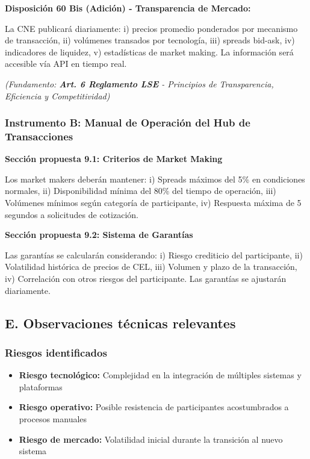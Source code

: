 \documentclass{cel}
\begin{document}
\textbf{Disposición 60 Bis (Adición) - Transparencia de Mercado:}

\textquotedbl{}La CNE publicará diariamente: i) precios promedio ponderados por mecanismo de transacción, ii) volúmenes transados por tecnología, iii) spreads bid-ask, iv) indicadores de liquidez, v) estadísticas de market making. La información será accesible vía API en tiempo real.\textquotedbl{}

\textit{(Fundamento: \textbf{Art. 6 Reglamento LSE} - Principios de Transparencia, Eficiencia y Competitividad)}


\subsubsection{Instrumento B: Manual de Operación del Hub de Transacciones}
\nopagebreak

\textbf{Sección propuesta 9.1: Criterios de Market Making}

\textquotedbl{}Los market makers deberán mantener: i) Spreads máximos del 5\% en condiciones normales, ii) Disponibilidad mínima del 80\% del tiempo de operación, iii) Volúmenes mínimos según categoría de participante, iv) Respuesta máxima de 5 segundos a solicitudes de cotización.\textquotedbl{}


\textbf{Sección propuesta 9.2: Sistema de Garantías}

\textquotedbl{}Las garantías se calcularán considerando: i) Riesgo crediticio del participante, ii) Volatilidad histórica de precios de CEL, iii) Volumen y plazo de la transacción, iv) Correlación con otros riesgos del participante. Las garantías se ajustarán diariamente.\textquotedbl{}


\subsection{E. Observaciones técnicas relevantes}
\nopagebreak

\subsubsection{Riesgos identificados}
\nopagebreak

\begin{itemize}
\item \textbf{Riesgo tecnológico:} Complejidad en la integración de múltiples sistemas y plataformas
\item \textbf{Riesgo operativo:} Posible resistencia de participantes acostumbrados a procesos manuales
\item \textbf{Riesgo de mercado:} Volatilidad inicial durante la transición al nuevo sistema

\end{itemize}
\end{document}

